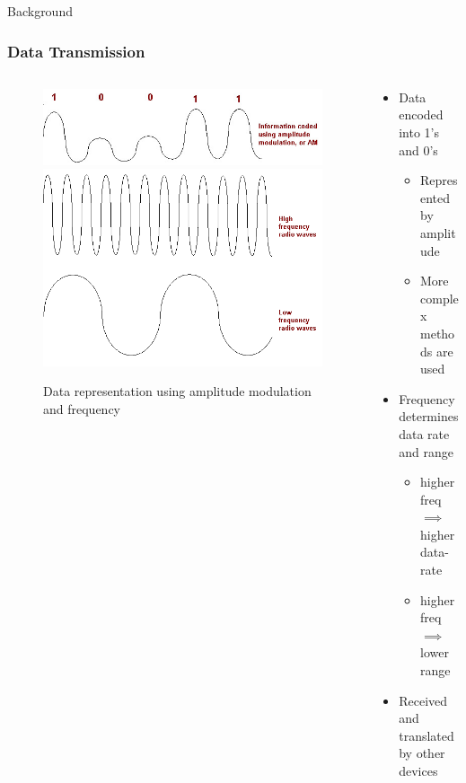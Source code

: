 \documentclass{beamer}
\begin{document}
\begin{frame}{Background}
  \frametitle{Data Transmission}
  \begin{columns}
    \begin{column}{0.4\textwidth}
        \begin{figure}[htbp]
          \centering
          \includegraphics[width=\textwidth]{images/AMdataTransmission.jpg}
          \includegraphics[width=.8\textwidth]{images/Frequency_graph.png}
          \caption{Data representation using amplitude modulation and frequency \cite{AMdata}}
          \label{fig:AM_data_transmission}
        \end{figure}
    \end{column}
    \begin{column}{0.6\textwidth}
      \begin{itemize}
        \item Data encoded into 1's and 0's
          \begin{itemize}
            \item Represented by amplitude
            \item More complex methods are used
          \end{itemize}
        \item Frequency determines data rate and range
        \begin{itemize}
          \item higher freq $\implies$ higher data-rate
          \item higher freq $\implies$ lower range
        \end{itemize}
        \item Received and translated by other devices
      \end{itemize}
    \end{column}
  \end{columns}
\end{frame}
\end{document}

